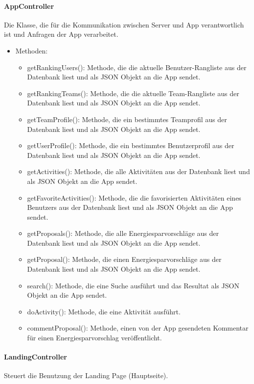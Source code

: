 	\paragraph{AppController}Die Klasse, die für die Kommunikation zwischen Server und App verantwortlich ist und Anfragen der App verarbeitet.
		\begin{itemize}
			\item Methoden:
			\begin{itemize}
				\item getRankingUsers(): Methode, die die aktuelle Benutzer-Rangliste aus der Datenbank liest und als JSON Objekt an die App sendet.
				\item getRankingTeams(): Methode, die die aktuelle Team-Rangliste aus der Datenbank liest und als JSON Objekt an die App sendet.
				\item getTeamProfile(): Methode, die ein bestimmtes Teamprofil aus der Datenbank liest und als JSON Objekt an die App sendet.
				\item getUserProfile(): Methode, die ein bestimmtes Benutzerprofil aus der Datenbank liest und als JSON Objekt an die App sendet.
				\item getActivities(): Methode, die alle Aktivitäten aus der Datenbank liest und als JSON Objekt an die App sendet.
				\item getFavoriteActivities(): Methode, die die favorisierten Aktivitäten eines Benutzers aus der Datenbank liest und als JSON Objekt an die App sendet.
				\item getProposals(): Methode, die alle Energiesparvorschläge aus der Datenbank liest und als JSON Objekt an die App sendet.
				\item getProposal(): Methode, die einen Energiesparvorschläge aus der Datenbank liest und als JSON Objekt an die App sendet.
				\item search(): Methode, die eine Suche ausführt und das Resultat als JSON Objekt an die App sendet.
				\item doActivity(): Methode, die eine Aktivität ausführt.
				\item commentProposal(): Methode, einen von der App gesendeten Kommentar für einen Energiesparvorschlag veröffentlicht.
			\end{itemize}
		\end{itemize}
	\paragraph{LandingController}Steuert die Benutzung der Landing Page (Hauptseite).
